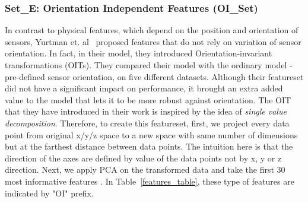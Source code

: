\documentclass[journal,article,submit,moreauthors,pdftex]{Definitions/mdpi}
\begin{document}
\subsubsection{Set\_E: Orientation Independent Features (OI\_Set)}
In contrast to physical features, which depend on the position and orientation of sensors, Yurtman et. al~\cite{yurtman2017activity} proposed features that do not rely on variation of sensor orientation. In fact, in their model, they introduced Orientation-invariant transformations (OITs). They compared their model with the ordinary model - pre-defined sensor orientation, on five different datasets. Although their featureset did not have a significant impact on performance, it brought an extra added value to the model that lets it to be more robust against orientation. The OIT that they have introduced in their work is inspired by the idea of \textit{single value decomposition}\cite{moon2000mathematical}. Therefore, to create this featureset, first, we project every data point from original x/y/z space to a new space with same number of dimensions but at the farthest distance between data points. The intuition here is that the direction of the axes are defined by value of the data points not by x, y or z direction. Next, we apply PCA on the transformed data and take the first 30 most informative features \cite{janidarmian2017comprehensive}. In Table~\ref{features_table}, these type of features  are indicated by "OI" prefix.
\end{document}
